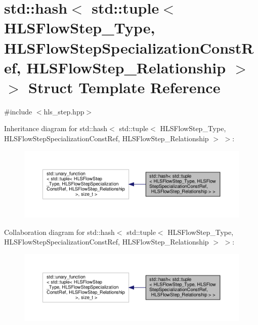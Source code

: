 \hypertarget{structstd_1_1hash_3_01std_1_1tuple_3_01HLSFlowStep__Type_00_01HLSFlowStepSpecializationConstRef_bc8b707a477881811f135e704822f95e}{}\section{std\+:\+:hash$<$ std\+:\+:tuple$<$ H\+L\+S\+Flow\+Step\+\_\+\+Type, H\+L\+S\+Flow\+Step\+Specialization\+Const\+Ref, H\+L\+S\+Flow\+Step\+\_\+\+Relationship $>$ $>$ Struct Template Reference}
\label{structstd_1_1hash_3_01std_1_1tuple_3_01HLSFlowStep__Type_00_01HLSFlowStepSpecializationConstRef_bc8b707a477881811f135e704822f95e}


{\ttfamily \#include $<$hls\+\_\+step.\+hpp$>$}



Inheritance diagram for std\+:\+:hash$<$ std\+:\+:tuple$<$ H\+L\+S\+Flow\+Step\+\_\+\+Type, H\+L\+S\+Flow\+Step\+Specialization\+Const\+Ref, H\+L\+S\+Flow\+Step\+\_\+\+Relationship $>$ $>$\+:
\nopagebreak
\begin{figure}[H]
\begin{center}
\leavevmode
\includegraphics[width=350pt]{d7/df9/structstd_1_1hash_3_01std_1_1tuple_3_01HLSFlowStep__Type_00_01HLSFlowStepSpecializationConstRef_9794729d3b932e1d96abc230e036af7a}
\end{center}
\end{figure}


Collaboration diagram for std\+:\+:hash$<$ std\+:\+:tuple$<$ H\+L\+S\+Flow\+Step\+\_\+\+Type, H\+L\+S\+Flow\+Step\+Specialization\+Const\+Ref, H\+L\+S\+Flow\+Step\+\_\+\+Relationship $>$ $>$\+:
\nopagebreak
\begin{figure}[H]
\begin{center}
\leavevmode
\includegraphics[width=350pt]{df/d34/structstd_1_1hash_3_01std_1_1tuple_3_01HLSFlowStep__Type_00_01HLSFlowStepSpecializationConstRef_b50ebf70e1038f6d97fa49cb6571bbe2}
\end{center}
\end{figure}
